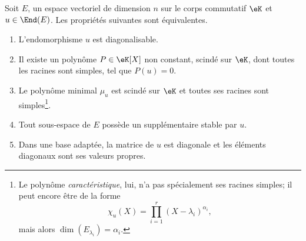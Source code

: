 \begin{theorem}     \label{ThoDigLEQEXR}
    Soit \( E\), un espace vectoriel de dimension \( n\) sur le corps commutatif \( \eK\) et \( u\in\End(E)\). Les propriétés suivantes sont équivalentes.
    \begin{enumerate}
        \item       \label{ItemThoDigLEQEXRiv}
            L'endomorphisme \( u\) est diagonalisable.
        \item       \label{ItemThoDigLEQEXRi}
            Il existe un polynôme \( P\in\eK[X]\) non constant, scindé sur \(\eK\), dont toutes les racines sont simples, tel que \( P(u)=0\).
        \item       \label{ItemThoDigLEQEXRii}
            Le polynôme minimal \( \mu_u\) est scindé sur \(\eK\) et toutes ses racines sont simples\footnote{Le polynôme \emph{caractéristique}, lui, n'a pas spécialement ses racines simples; il peut encore être de la forme
            \begin{equation}
                \chi_u(X)=\prod_{i=1}^r(X-\lambda_i)^{\alpha_i},
            \end{equation}
            mais alors \( \dim(E_{\lambda_i})=\alpha_i\). }.
        \item       \label{ItemThoDigLEQEXRiii}
            Tout sous-espace de \( E\) possède un supplémentaire stable par \( u\).
        \item       \label{ITEMooZNJFooEiqDYp}
            Dans une base adaptée, la matrice de \( u\) est diagonale et les éléments diagonaux sont ses valeurs propres.
    \end{enumerate}
\end{theorem}

